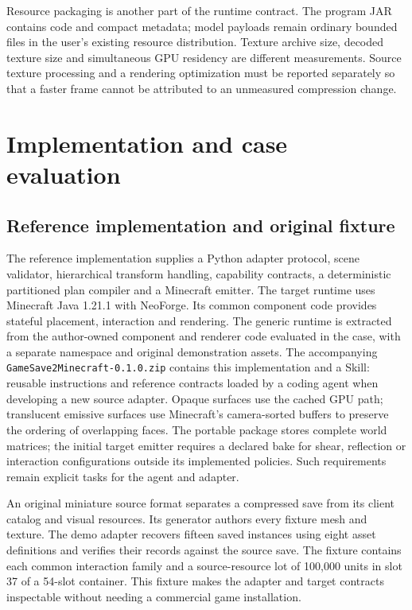 \documentclass[11pt]{article}
\begin{document}
Resource packaging is another part of the runtime contract. The program JAR
contains code and compact metadata; model payloads remain ordinary bounded files
in the user's existing resource distribution. Texture archive size, decoded
texture size and simultaneous GPU residency are different measurements. Source
texture processing and a rendering optimization must be reported separately so
that a faster frame cannot be attributed to an unmeasured compression change.

\section{Implementation and case evaluation}

\subsection{Reference implementation and original fixture}

The reference implementation supplies a Python adapter protocol, scene validator,
hierarchical transform handling, capability contracts, a deterministic partitioned
plan compiler and a Minecraft emitter. The target runtime uses Minecraft Java
1.21.1 with NeoForge. Its common component code provides stateful placement,
interaction and rendering. The generic runtime is extracted from the author-owned
component and renderer code evaluated in the case, with a separate namespace and
original demonstration assets. The accompanying \texttt{GameSave2Minecraft-0.1.0.zip}
contains this implementation and a Skill: reusable instructions and reference
contracts loaded by a coding agent when developing a new source adapter.
Opaque surfaces use the cached GPU path; translucent emissive surfaces use
Minecraft's camera-sorted buffers to preserve the ordering of overlapping faces.
The portable package stores complete world matrices;
the initial target emitter requires a declared bake for shear, reflection or
interaction configurations outside its implemented policies. Such requirements
remain explicit tasks for the agent and adapter.

An original miniature source format separates a compressed save from its client
catalog and visual resources. Its generator authors every fixture mesh and
texture. The demo adapter recovers fifteen saved instances using eight asset
definitions and verifies their records against the source save. The fixture
contains each common interaction family and a source-resource lot of 100,000
units in slot 37 of a 54-slot container. This fixture makes the adapter and target
contracts inspectable without needing a commercial game installation.
\end{document}
